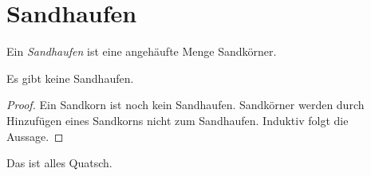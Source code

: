 \documentclass{scrartcl}
\begin{document}
  \thispagestyle{empty}

  \section{Sandhaufen}

  \begin{definition}[Sandhaufen]
    Ein \emph{Sandhaufen} ist eine
    angehäufte Menge Sandkörner.
  \end{definition}

  \begin{theorem}[Sandhaufensatz]
    Es gibt keine Sandhaufen.
  \end{theorem}

  \begin{proof}
    Ein Sandkorn ist noch kein Sandhaufen.
    Sandkörner werden durch Hinzufügen
    eines Sandkorns nicht zum Sandhaufen.
    Induktiv folgt die Aussage.
  \end{proof}

  \begin{remark}
    Das ist alles Quatsch.
  \end{remark}
\end{document}
